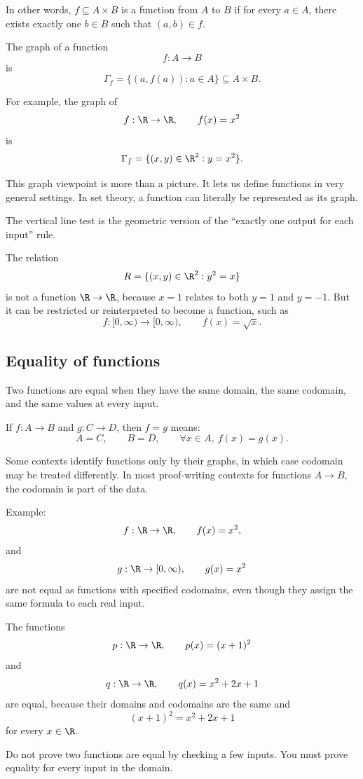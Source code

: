 In other words, $f\subseteq A\times B$ is a function from $A$ to $B$ if for every $a\in A$, there exists exactly one $b\in B$ such that $(a,b)\in f$.

The graph of a function
\[
f:A\to B
\]
is
\[
\Gamma_f=\{(a,f(a)):a\in A\}\subseteq A\times B.
\]

For example, the graph of
\[
f:\R\to\R,\qquad f(x)=x^2
\]
is
\[
\Gamma_f=\{(x,y)\in\R^2:y=x^2\}.
\]

This graph viewpoint is more than a picture. It lets us define functions in very general settings. In set theory, a function can literally be represented as its graph.

\begin{focusbox}
The vertical line test is the geometric version of the ``exactly one output for each input'' rule.
\end{focusbox}

The relation
\[
R=\{(x,y)\in\R^2:y^2=x\}
\]
is not a function $\R\to\R$, because $x=1$ relates to both $y=1$ and $y=-1$. But it can be restricted or reinterpreted to become a function, such as
\[
f:[0,\infty)\to[0,\infty),\qquad f(x)=\sqrt{x}.
\]

\subsection{Equality of functions}

Two functions are equal when they have the same domain, the same codomain, and the same values at every input.

\begin{formalbox}
If $f:A\to B$ and $g:C\to D$, then $f=g$ means:
\[
A=C,\qquad B=D,\qquad \forall x\in A,\ f(x)=g(x).
\]
\end{formalbox}

Some contexts identify functions only by their graphs, in which case codomain may be treated differently. In most proof-writing contexts for functions $A\to B$, the codomain is part of the data.

Example:
\[
f:\R\to\R,\qquad f(x)=x^2,
\]
and
\[
g:\R\to[0,\infty),\qquad g(x)=x^2
\]
are not equal as functions with specified codomains, even though they assign the same formula to each real input.

The functions
\[
p:\R\to\R,\qquad p(x)=(x+1)^2
\]
and
\[
q:\R\to\R,\qquad q(x)=x^2+2x+1
\]
are equal, because their domains and codomains are the same and
\[
(x+1)^2=x^2+2x+1
\]
for every $x\in\R$.

\begin{trapbox}
Do not prove two functions are equal by checking a few inputs. You must prove equality for every input in the domain.
\end{trapbox}

